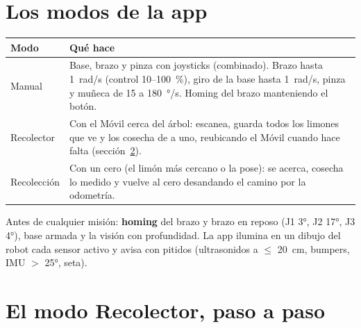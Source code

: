 \section{Los modos de la app}

\begin{center}
\begin{tabular}{@{}lp{11.5cm}@{}}
\toprule
\textbf{Modo} & \textbf{Qué hace} \\
\midrule
Manual & Base, brazo y pinza con joysticks (combinado). Brazo hasta 1~rad/s (control 10--100~\%), giro de la base
  hasta 1~rad/s, pinza y muñeca de 15 a 180~°/s. Homing del brazo manteniendo el botón. \\
Recolector & Con el Móvil cerca del árbol: escanea, guarda todos los limones que ve y los cosecha de a uno,
  reubicando el Móvil cuando hace falta (sección~\ref{sec:recolector}). \\
Recolección & Con un cero (el limón más cercano o la pose): se acerca, cosecha lo medido y vuelve al cero
  desandando el camino por la odometría. \\
\bottomrule
\end{tabular}
\end{center}

Antes de cualquier misión: \textbf{homing} del brazo y brazo en reposo (J1 3°, J2 17°, J3 4°), base armada y la
visión con profundidad. La app ilumina en un dibujo del robot cada sensor activo y avisa con pitidos (ultrasonidos a
$\le$ 20~cm, bumpers, IMU $>$ 25°, seta).

\section{El modo Recolector, paso a paso}\label{sec:recolector}

